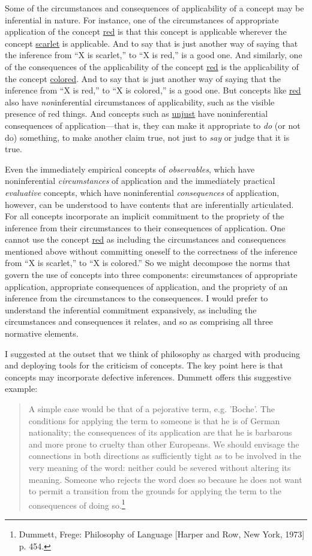 Some of the circumstances and consequences of applicability of a concept
may be inferential in nature. For instance, one of the circumstances of
appropriate application of the concept \underline{red} is that this
concept is applicable wherever the concept \underline{scarlet} is
applicable. And to say that is just another way of saying that the
inference from ``X is scarlet,'' to ``X is red,'' is a good one. And
similarly, one of the consequences of the applicability of the concept
\underline{red} is the applicability of the concept \underline{colored}.
And to say that is just another way of saying that the inference from
``X is red,'' to ``X is colored,'' is a good one. But concepts like
\underline{red} also have \emph{non}inferential circumstances of
applicability, such as the visible presence of red things. And concepts
such as \underline{unjust} have noninferential consequences of
application---that is, they can make it appropriate to \emph{do} (or not
do) something, to make another claim true, not just to \emph{say} or
judge that it is true.

Even the immediately empirical concepts of \emph{observables}, which
have noninferential \emph{circumstances} of application and the
immediately practical \emph{evaluative} concepts, which have
noninferential \emph{consequences} of application, however, can be
understood to have contents that are inferentially articulated. For all
concepts incorporate an implicit commitment to the propriety of the
inference from their circumstances to their consequences of application.
One cannot use the concept \underline{red} as including the
circumstances and consequences mentioned above without committing
oneself to the correctness of the inference from ``X is scarlet,'' to
``X is colored.'' So we might decompose the norms that govern the use of
concepts into three components: circumstances of appropriate
application, appropriate consequences of application, and the propriety
of an inference from the circumstances to the consequences. I would
prefer to understand the inferential commitment expansively, as
including the circumstances and consequences it relates, and so as
comprising all three normative elements.

I suggested at the outset that we think of philosophy as charged with
producing and deploying tools for the criticism of concepts. The key
point here is that concepts may incorporate defective inferences.
Dummett offers this suggestive example:

\begin{quote}
A simple case would be that of a pejorative term, e.g. 'Boche'. The
conditions for applying the term to someone is that he is of German
nationality; the consequences of its application are that he is
barbarous and more prone to cruelty than other Europeans. We should
envisage the connections in both directions as sufficiently tight as to
be involved in the very meaning of the word: neither could be severed
without altering its meaning. Someone who rejects the word does so
because he does not want to permit a transition from the grounds for
applying the term to the consequences of doing so.\footnote{Dummett,
  Frege: Philosophy of Language {[}Harper and Row, New York, 1973{]} p.
  454.}
\end{quote}

